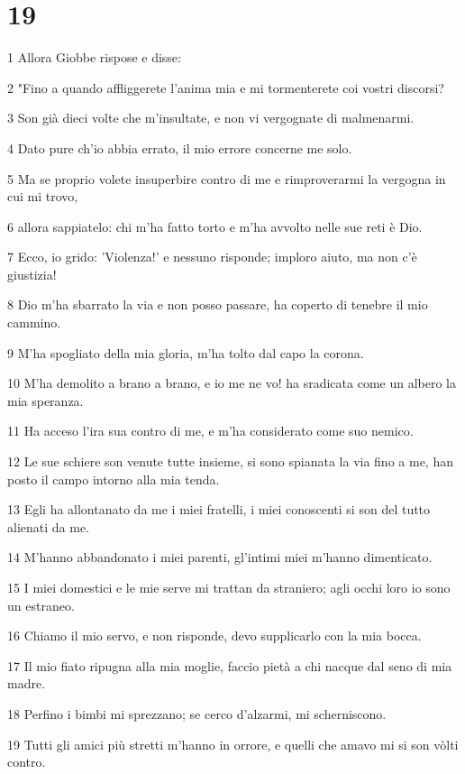 \chapter{19}

\par 1 Allora Giobbe rispose e disse:
\par 2 "Fino a quando affliggerete l'anima mia e mi tormenterete coi vostri discorsi?
\par 3 Son già dieci volte che m'insultate, e non vi vergognate di malmenarmi.
\par 4 Dato pure ch'io abbia errato, il mio errore concerne me solo.
\par 5 Ma se proprio volete insuperbire contro di me e rimproverarmi la vergogna in cui mi trovo,
\par 6 allora sappiatelo: chi m'ha fatto torto e m'ha avvolto nelle sue reti è Dio.
\par 7 Ecco, io grido: 'Violenza!' e nessuno risponde; imploro aiuto, ma non c'è giustizia!
\par 8 Dio m'ha sbarrato la via e non posso passare, ha coperto di tenebre il mio cammino.
\par 9 M'ha spogliato della mia gloria, m'ha tolto dal capo la corona.
\par 10 M'ha demolito a brano a brano, e io me ne vo! ha sradicata come un albero la mia speranza.
\par 11 Ha acceso l'ira sua contro di me, e m'ha considerato come suo nemico.
\par 12 Le sue schiere son venute tutte insieme, si sono spianata la via fino a me, han posto il campo intorno alla mia tenda.
\par 13 Egli ha allontanato da me i miei fratelli, i miei conoscenti si son del tutto alienati da me.
\par 14 M'hanno abbandonato i miei parenti, gl'intimi miei m'hanno dimenticato.
\par 15 I miei domestici e le mie serve mi trattan da straniero; agli occhi loro io sono un estraneo.
\par 16 Chiamo il mio servo, e non risponde, devo supplicarlo con la mia bocca.
\par 17 Il mio fiato ripugna alla mia moglie, faccio pietà a chi nacque dal seno di mia madre.
\par 18 Perfino i bimbi mi sprezzano; se cerco d'alzarmi, mi scherniscono.
\par 19 Tutti gli amici più stretti m'hanno in orrore, e quelli che amavo mi si son vòlti contro.
